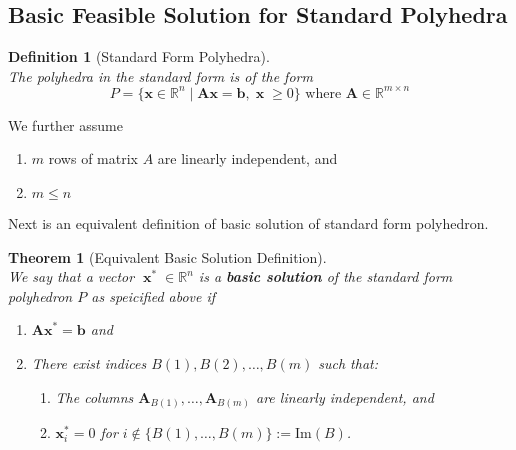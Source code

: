 \documentclass[12pt]{article}
\newcommand{\ima}{\mathrm{Im}}
\newtheorem{definition}{Definition}[section]
\newtheorem{theorem}{Theorem}[section]
\theoremstyle{definition}
\DeclareMathOperator{\x}{\mathbf{x}}
\begin{document}
\subsection{Basic Feasible Solution for Standard Polyhedra}
\begin{definition}[Standard Form Polyhedra]
\hfill\\\normalfont The polyhedra in the standard form is of the form 
\[
P=\{\mathbf{x}\in\mathbb{R}^n\mid \mathbf{Ax}=\mathbf{b}, \x\geq 0\}\text{ where }\mathbf{A}\in \mathbb{R}^{m\times n}
\] 
\end{definition}
We further assume
\begin{enumerate}
  \item $m$ rows of matrix $A$ are linearly independent, and
  \item $m\leq n$
\end{enumerate}
Next is an equivalent definition of basic solution of standard form polyhedron.
\begin{theorem}[Equivalent Basic Solution Definition]
\hfill\\\normalfont We say that a vector $\x^\ast\in\mathbb{R}^n$ is a \textbf{basic solution} of the standard form polyhedron $P$ as speicified above if
\begin{enumerate}
  \item $\mathbf{Ax}^\ast = \mathbf{b}$ and
  \item There exist indices $B(1), B(2), \ldots, B(m)$ such that:
  \begin{enumerate}
    \item The columns $\mathbf{A}_{B(1)}, \ldots, \mathbf{A}_{B(m)}$ are linearly independent, and
    \item $\mathbf{x}_i^\ast = 0$ for $i\not\in \{B(1), \ldots, B(m)\}:=\ima(B)$.
  \end{enumerate}
\end{enumerate}
\end{theorem}
\end{document}
